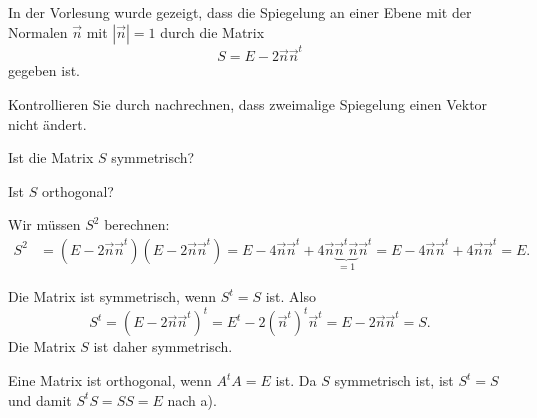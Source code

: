 In der Vorlesung wurde gezeigt, dass die Spiegelung an einer Ebene
mit der Normalen $\vec n$ mit $|\vec n|=1$ durch die Matrix
\[
S=E-2\vec n\vec n^t
\]
gegeben ist.
\begin{teilaufgaben}
\item Kontrollieren Sie durch nachrechnen, dass zweimalige Spiegelung einen
Vektor nicht ändert.
\item Ist die Matrix $S$ symmetrisch?
\item Ist $S$ orthogonal?
\end{teilaufgaben}


\begin{loesung}
\begin{teilaufgaben}
\item
Wir müssen $S^2$ berechnen:
\begin{align*}
S^2
&=
(E-2\vec n\vec n^t) (E-2\vec n\vec n^t)
=
E-4\vec n\vec n^t +4\vec n\underbrace{\vec n^t \vec  n}_{\displaystyle=1}\vec n^t
=
E-4\vec n\vec n^t +4\vec n \vec n^t
=
E.
\end{align*}
\item
Die Matrix ist symmetrisch, wenn $S^t=S$ ist.
Also
\[
S^t
=
(E-2\vec n\vec n^t)^t
=
E^t - 2(\vec n^t)^t\vec n^t
=
E-2\vec n\vec n^t
=
S.
\]
Die Matrix $S$ ist daher symmetrisch.
\item
Eine Matrix ist orthogonal, wenn $A^tA=E$ ist.
Da $S$ symmetrisch ist, ist $S^t=S$ und damit
$S^tS=SS=E$ nach a).
\end{teilaufgaben}
\end{loesung}

